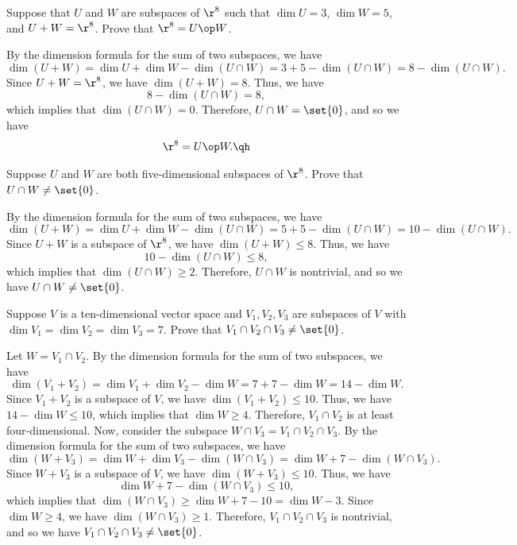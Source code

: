 \begin{exercise}[2c12]
    Suppose that $U$ and $W$ are subspaces of $\r^8$ such that $\dim U = 3$, $\dim W = 5$, and $U + W = \r^8$. Prove that $\r^8 = U \op W$.
\end{exercise}

\begin{sol}
    By the dimension formula for the sum of two subspaces, we have
    \[\dim(U + W) = \dim U + \dim W - \dim(U \cap W) = 3 + 5 - \dim(U \cap W) = 8 - \dim(U \cap W).\]
    Since $U + W = \r^8$, we have $\dim(U + W) = 8$. Thus, we have
    \[8 - \dim(U \cap W) = 8,\]
    which implies that $\dim(U \cap W) = 0$. Therefore, $U \cap W = \set{0}$, and so we have
    \[\r^8 = U \op W. \qh\]
\end{sol}

\begin{exercise}[2c13]
    Suppose $U$ and $W$ are both five-dimensional subspaces of $\r^8$. Prove that $U \cap W \neq \set{0}$.
\end{exercise}

\begin{sol}
    By the dimension formula for the sum of two subspaces, we have
    \[\dim(U + W) = \dim U + \dim W - \dim(U \cap W) = 5 + 5 - \dim(U \cap W) = 10 - \dim(U \cap W).\]
    Since $U + W$ is a subspace of $\r^8$, we have $\dim(U + W) \leq 8$. Thus, we have
    \[10 - \dim(U \cap W) \leq 8,\]
    which implies that $\dim(U \cap W) \geq 2$. Therefore, $U \cap W$ is nontrivial, and so we have $U \cap W \neq \set{0}$.
\end{sol}

\begin{exercise}[2c14]
    Suppose $V$ is a ten-dimensional vector space and $V_1, V_2, V_3$ are subspaces of $V$ with $\dim V_1 = \dim V_2 = \dim V_3 = 7$. Prove that $V_1 \cap V_2 \cap V_3 \neq \set{0}$.
\end{exercise}

\begin{sol}
    Let $W = V_1 \cap V_2$. By the dimension formula for the sum of two subspaces, we have
    \[\dim(V_1 + V_2) = \dim V_1 + \dim V_2 - \dim W = 7 + 7 - \dim W = 14 - \dim W.\]
    Since $V_1 + V_2$ is a subspace of $V$, we have $\dim(V_1 + V_2) \leq 10$. Thus, we have $14 - \dim W \leq 10$, which implies that $\dim W \geq 4$. Therefore, $V_1 \cap V_2$ is at least four-dimensional. Now, consider the subspace $W \cap V_3 = V_1 \cap V_2 \cap V_3$. By the dimension formula for the sum of two subspaces, we have
    \[\dim(W + V_3) = \dim W + \dim V_3 - \dim(W \cap V_3) = \dim W + 7 - \dim(W \cap V_3).\]
    Since $W + V_3$ is a subspace of $V$, we have $\dim(W + V_3) \leq 10$. Thus, we have
    \[\dim W + 7 - \dim(W \cap V_3) \leq 10,\]
    which implies that $\dim(W \cap V_3) \geq \dim W + 7 - 10 = \dim W - 3$. Since $\dim W \geq 4$, we have $\dim(W \cap V_3) \geq 1$. Therefore, $V_1 \cap V_2 \cap V_3$ is nontrivial, and so we have $V_1 \cap V_2 \cap V_3 \neq \set{0}$.
\end{sol}

